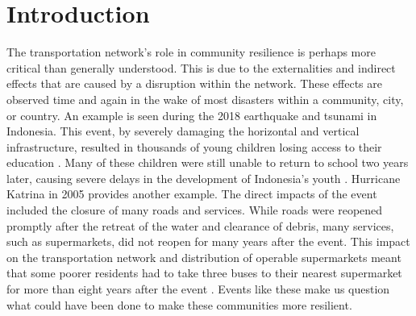 \documentclass[review,3p,times,onecolumn,sort&compress,12pt]{elsarticle}
\let \cite \parencite
\begin{document}

\section{Introduction}
The transportation network's role in community resilience is perhaps more critical than generally understood.
This is due to the externalities and indirect effects that are caused by a disruption within the network. 
These effects are observed time and again in the wake of most disasters within a community, city, or country.
An example is seen during the 2018 earthquake and tsunami in Indonesia.
This event, by severely damaging the horizontal and vertical infrastructure, resulted in thousands of young children losing access to their education \cite{Claire_Garmirian2019-lv}. 
Many of these children were still unable to return to school two years later, causing severe delays in the development of Indonesia's youth \cite{gibbs2019delayed}.
Hurricane Katrina in 2005 provides another example. 
The direct impacts of the event included the closure of many roads and services.
While roads were reopened promptly after the retreat of the water and clearance of debris, many services, such as supermarkets, did not reopen for many years after the event.
This impact on the transportation network and distribution of operable supermarkets meant that some poorer residents had to take three buses to their nearest supermarket for more than eight years after the event \cite{Netter_2016-zp}.
Events like these make us question what could have been done to make these communities more resilient.
\end{document}
